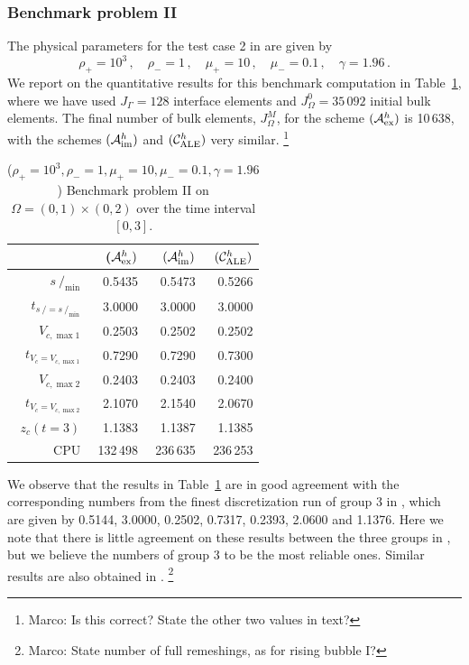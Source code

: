 \documentclass[a4paper,12pt,onecolumn]{article}
\newcommand{\strikes}{\mbox{$s\!\!\!\!\:/$}}
\newcommand{\schemeAex}{{\mathcal{A}^h_{\rm ex}}}
\newcommand{\schemeAim}{{\mathcal{A}^h_{\rm im}}}
\newcommand{\schemeALE}{{\mathcal{C}^h_{\rm ALE}}}
\begin{document}
\subsubsection{Benchmark problem II}

The physical parameters for the test case 2 in \cite[Table~I]{HysingTKPBGT09}
are given by
\begin{equation} \label{eq:Hysing2}
\rho_+ = 10^3\,,\quad \rho_- = 1\,,\quad \mu_+ = 10\,,\quad \mu_- = 0.1\,,\quad
\gamma = 1.96\,.
\end{equation}
We report on the quantitative results for this benchmark computation in
Table~\ref{tab:risingbubbleII}, where we have used
$J_\Gamma=128$ interface elements and $J_\Omega^0=35\,092$ initial
bulk elements. The final number of bulk
elements, $J_\Omega^M$, for the scheme $(\schemeAex)$ is 10\,638,
with the schemes $(\schemeAim)$ and $(\schemeALE)$ very similar.
\footnote{Marco: Is this correct? State the other two values in text?}
\begin{table}
\center
\hspace*{-3.25cm}
\begin{tabular}{rrrr}
\hline
& ($\schemeAex)$ & $(\schemeAim)$ & $(\schemeALE)$ \\
\hline
$\strikes_{\min}$                & 0.5435 & 0.5473 & 0.5266 \\
$t_{\strikes = \strikes_{\min}}$ & 3.0000 & 3.0000 & 3.0000 \\
$V_{c,\max 1}$                   & 0.2503 & 0.2502 & 0.2502 \\
$t_{V_c = V_{c,\max 1}}$         & 0.7290 & 0.7290 & 0.7300 \\
$V_{c,\max 2}$                   & 0.2403 & 0.2403 & 0.2400 \\
$t_{V_c = V_{c,\max 2}}$         & 2.1070 & 2.1540 & 2.0670 \\
$z_c(t=3)$                       & 1.1383 & 1.1387 & 1.1385 \\
CPU                              & 132\,498 & 236\,635 & 236\,253 \\
\hline
\end{tabular}
\hspace*{-3.25cm}
\caption{($\rho_+ = 10^3,\rho_- = 1,\mu_+ = 10,\mu_- =0.1,\gamma = 1.96$)
Benchmark problem II on $\Omega = (0,1) \times (0,2)$ over the time
interval $[0,3]$.}
\label{tab:risingbubbleII}
\end{table}%
We observe that the results in Table~\ref{tab:risingbubbleII}
are in good agreement with the corresponding numbers from the finest
discretization run of group 3 in \cite{HysingTKPBGT09}, which are given by
0.5144, 3.0000, 0.2502, 0.7317, 0.2393, 2.0600 and 1.1376. Here we note that
there is little agreement on these results between the three groups in
\cite{HysingTKPBGT09}, but we believe the numbers of group 3 to be the most
reliable ones. Similar results are also obtained in
\cite[Tables~5 and 6]{fluidfbp}.
\footnote{Marco: State number of full remeshings, as for rising bubble I?}
\end{document}
